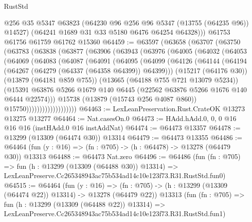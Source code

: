\begin{lexlean}{RustStd}
\begin{coremodule}
        @256
        @35
        @5347
        @63823
        (@64230 @96 @256 @96 @5347 (@13755 (@64235 @96)) @14527)
        (@64241 @1689 @31 @33 @5180 @6476 @64254 @64328)))
    @61753
    @61756
    @61759
    @61762
    @15360
@64459 := @63597
    (@63658
      (@63707
        (@63750
          (@63783
            (@63838
              (@63877
                (@63906
                  (@63943
                    (@63976
                      (@64005
                        (@64032
                          (@64053
                            (@64069
                              (@64083
                                (@64087
                                  (@64091
                                    (@64095
                                      (@64099
                                        (@64126
                                          (@64144
                                            (@64194
                                              (@64267 (@64279 (@64337 (@64358 @64399)) @64399)))
                                            (@15217 (@64176 @30))
                                            (@13879 (@64181 @859 @755))
                                            (@13665 (@64188 @755 @721 @13079 @5234))
                                            (@15391
                                              @63876
                                              @5266
                                              @1679
                                              @140
                                              @6445
                                              (@22562 @63876 @5266 @1676 @140 @6444 @22574)))
                                          @15738
                                          (@13879 (@15743 @256 @4087 @860))
                                          @15750)))))))))))))))))))
@64463 := LexLeanPreservation.Rust.CrateOK @13273 @13275 @13277
@64464 := Nat.casesOn.{0}
@64473 := HAdd.hAdd.{0, 0, 0} @16 @16 @16 (instHAdd.{0} @16 instAddNat)
@64474 := @64473 @13357
@64478 := @13299 (@13309 (@64474 @30)) @13314
@64479 := @64473 @13355
@64486 := @64464 (fun (y : @16) => (fn : @705) -> (h : @64478) -> @13278 (@64479 @30)) @13313
@64488 := @64473 Nat.zero
@64496 := @64486
    (fun (fn : @705) =>
    fun (h : @13299 (@13309 (@64488 @30)) @13314) =>
    LexLeanPreserve.Cc265348943ac75b534ad14c10e123f73.R31.RustStd.fun0)
@64515 := @64464
    (fun (y : @16) =>
    (fn : @705) -> (h : @13299 (@13309 (@64474 @22)) @13314) -> @13278 (@64479 @22))
    @13313
    (fun (fn : @705) =>
    fun (h : @13299 (@13309 (@64488 @22)) @13314) =>
    LexLeanPreserve.Cc265348943ac75b534ad14c10e123f73.R31.RustStd.fun1)

\end{coremodule}
\end{lexlean}
